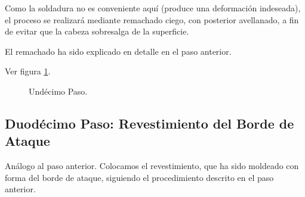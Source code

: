 Como la soldadura no es conveniente aquí (produce una deformación indeseada), el proceso se realizará mediante remachado ciego, con posterior avellanado, a fin de evitar que la cabeza sobresalga de la superficie. 

El remachado ha sido explicado en detalle en el paso anterior.

Ver figura \ref{fig:und}.

\begin{figure}[!htb]
\centering
{}
\caption{Undécimo Paso. \label{fig:und}}
\end{figure}

\pagebreak
\subsection{Duodécimo Paso: Revestimiento del Borde de Ataque}
Análogo al paso anterior. Colocamos el revestimiento, que ha sido moldeado con forma del borde de ataque, siguiendo el procedimiento descrito en el paso anterior.

